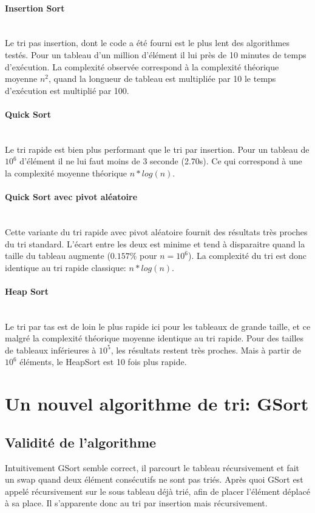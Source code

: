 \documentclass[11pt]{article}
\begin{document}
\paragraph{Insertion Sort}~\\
Le tri pas insertion, dont le code a été fourni est le plus lent des algorithmes testés. Pour un tableau d'un million d'élément il lui près de 10 minutes de temps d'exécution. La complexité observée correspond à la complexité théorique moyenne $ n^{2}$, quand la longueur de tableau est multipliée par 10 le temps d'exécution est multiplié par 100.

\paragraph{Quick Sort}~\\
Le tri rapide est bien plus performant que le tri par insertion. Pour un tableau de $ 10^{6}$ d'élément il ne lui faut moins de 3 seconde (2.70s). Ce qui correspond à une la complexité moyenne théorique $ n*log(n)$. 

\paragraph{Quick Sort avec pivot aléatoire}~\\
Cette variante du tri rapide avec pivot aléatoire fournit des résultats très proches du tri standard. L'écart entre les deux est minime et tend à disparaitre quand la taille du tableau augmente ($ 0.157\%$ pour $ n=10^{6}$). La complexité du tri est donc identique au tri rapide classique: $ n*log(n)$.
\paragraph{Heap Sort}~\\
Le tri par tas est de loin le plus rapide ici pour les tableaux de grande taille, et ce malgré la complexité théorique moyenne identique au tri rapide. Pour des tailles de tableaux inférieures à $ 10^{5}$, les résultats restent très proches. Mais à partir de $ 10^{6}$ éléments, le HeapSort est 10 fois plus rapide.
\section{Un nouvel algorithme de tri: GSort}
\subsection{Validité de l'algorithme}
Intuitivement GSort semble correct, il parcourt le tableau récursivement et fait un swap quand deux élément consécutifs ne sont pas triés. Après quoi GSort est appelé récursivement sur le sous tableau déjà trié, afin de placer l'élément déplacé à sa place. Il s'apparente donc au tri par insertion mais récursivement.
\end{document}
